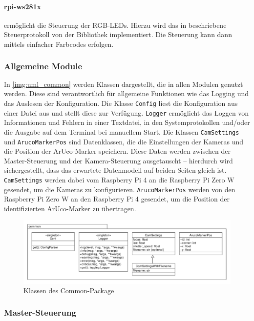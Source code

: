 \documentclass[./00PhotoBox.tex]{subfiles}
\begin{document}
\paragraph{rpi-ws281x}
\label{p:ws281x}
ermöglicht die Steuerung der RGB-LEDs. Hierzu wird das in \cite{ws2811} beschriebene Steuerprotokoll von der Bibliothek implementiert. Die Steuerung kann dann mittels einfacher Farbcodes erfolgen.

\subsubsection{Allgemeine Module}
In \autoref{img:uml_common} werden Klassen dargestellt, die in allen Modulen genutzt werden. Diese sind verantwortlich für allgemeine Funktionen wie das Logging und das Auslesen der Konfiguration. Die Klasse \texttt{Config} liest die Konfiguration aus einer Datei aus und stellt diese zur Verfügung. \texttt{Logger} ermöglicht das Loggen von Informationen und Fehlern in einer Textdatei, in den Systemprotokollen und/oder die Ausgabe auf dem Terminal bei manuellem Start. Die Klassen \texttt{CamSettings} und \texttt{ArucoMarkerPos} sind Datenklassen, die die Einstellungen der Kameras und die Position der ArUco-Marker speichern. Diese Daten werden zwischen der Master-Steuerung und der Kamera-Steuerung ausgetauscht -- hierdurch wird sichergestellt, dass das erwartete Datenmodell auf beiden Seiten gleich ist. \texttt{CamSettings} werden dabei vom Raspberry Pi 4 an die Raspberry Pi Zero W gesendet, um die Kameras zu konfigurieren. \texttt{ArucoMarkerPos} werden von den Raspberry Pi Zero W an den Raspberry Pi 4 gesendet, um die Position der identifizierten ArUco-Marker zu übertragen.

\begin{figure}
    \centering
    \includegraphics[width=1\textwidth]{./img/uml/uml_common_classdiagramm.pdf}
    \caption{Klassen des Common-Package}
    \label{img:uml_common}
\end{figure}


\subsubsection{Master-Steuerung}
\end{document}
